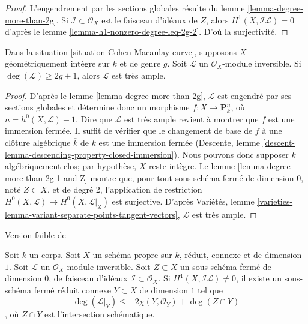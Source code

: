 \begin{proof}
L'engendrement par les sections globales résulte du lemme \ref{lemma-degree-more-than-2g}. Si $\mathcal{I} \subset \mathcal{O}_X$ est le faisceau d'idéaux de $Z$, alors $H^1(X, \mathcal{I}\mathcal{L}) = 0$ d'après le lemme \ref{lemma-h1-nonzero-degree-leq-2g-2}. D'où la surjectivité.
\end{proof}

\begin{lemma}
\label{lemma-degree-at-least-2g+1}
Dans la situation \ref{situation-Cohen-Macaulay-curve}, supposons $X$ géométriquement intègre sur $k$ et de genre $g$. Soit $\mathcal{L}$ un $\mathcal{O}_X$-module inversible. Si $\deg(\mathcal{L}) \geq 2g + 1$, alors $\mathcal{L}$ est très ample.
\end{lemma}

\begin{proof}
D'après le lemme \ref{lemma-degree-more-than-2g}, $\mathcal{L}$ est engendré par ses sections globales et détermine donc un morphisme $f : X \to \mathbf{P}^n_k$, où $n = h^0(X,\mathcal{L}) - 1$. Dire que $\mathcal{L}$ est très ample revient à montrer que $f$ est une immersion fermée. Il suffit de vérifier que le changement de base de $f$ à une clôture algébrique $\overline{k}$ de $k$ est une immersion fermée (Descente, lemme \ref{descent-lemma-descending-property-closed-immersion}). Nous pouvons donc supposer $k$ algébriquement clos; par hypothèse, $X$ reste intègre. Le lemme \ref{lemma-degree-more-than-2g-1-and-Z} montre que, pour tout sous-schéma fermé de dimension $0$, noté $Z\subset X$, et de degré 2, l'application de restriction $H^0(X, \mathcal{L}) \to H^0(X, \mathcal{L}|_Z)$ est surjective. D'après Variétés, lemme \ref{varieties-lemma-variant-separate-points-tangent-vectors}, $\mathcal{L}$ est très ample.
\end{proof}


\begin{lemma}
\label{lemma-vanishing-on-gorenstein}
\begin{reference}
Version faible de \cite[Lemme 4]{Jongmin}
\end{reference}
Soit $k$ un corps. Soit $X$ un schéma propre sur $k$, réduit, connexe et de dimension $1$. Soit $\mathcal{L}$ un $\mathcal{O}_X$-module inversible. Soit $Z \subset X$ un sous-schéma fermé de dimension $0$, de faisceau d'idéaux $\mathcal{I} \subset \mathcal{O}_X$. Si $H^1(X, \mathcal{I}\mathcal{L}) \not = 0$, il existe un sous-schéma fermé réduit connexe $Y \subset X$ de dimension $1$ tel que
$$
\deg(\mathcal{L}|_Y) \leq -2\chi(Y, \mathcal{O}_Y) + \deg(Z \cap Y)
$$, où $Z \cap Y$ est l'intersection schématique.
\end{lemma}

